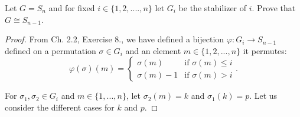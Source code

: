 \documentclass{article}
\begin{document}
Let $G = S_n$ and for fixed $i \in \{ 1, 2, ...., n \}$ let $G_i$ be the stabilizer of $i$. Prove that $G \cong S_{n - 1}$.

\begin{proof}
    From Ch. 2.2, Exercise 8., we have defined a bijection $\varphi: G_i \rightarrow S_{n - 1}$ defined on a permutation $\sigma \in G_i$ and an element $m \in \{ 1, 2, ..., n \}$ it permutes:
    \begin{equation*}
        \varphi(\sigma)(m) =
        \begin{cases}
            \sigma(m)      & \text{if } \sigma(m) \leq i \\
            \sigma(m) - 1  & \text{if } \sigma(m) > i
        \end{cases}.
    \end{equation*}

    For $\sigma_1, \sigma_2 \in G_i$ and $m \in \{ 1, ..., n \}$, let $\sigma_2(m) = k$ and $\sigma_1(k) = p$. Let us consider the different cases for $k$ and $p$.
    

\end{proof}
\end{document}
